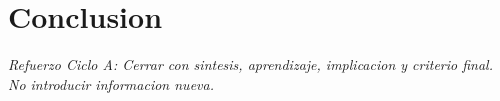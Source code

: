 \documentclass[
	spanish,
	letterpaper, oneside
]{article}
\begin{document}

\section{Conclusion}


\textit{Refuerzo Ciclo A: Cerrar con sintesis, aprendizaje, implicacion y criterio final. No introducir informacion nueva.}

\clearpage
\nocite{itescaSitioWeb,itescaMGAOferta,inegiPIBE2024,inegiPIBActividad,conevalPobrezaMexico,economiaDataMexicoSonora}

\end{document}
